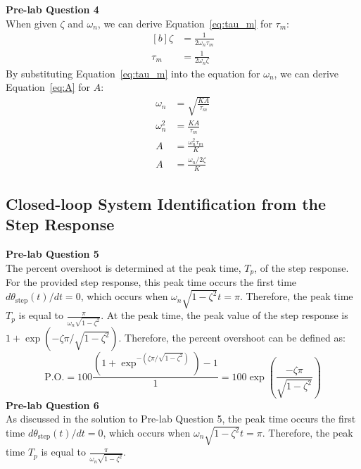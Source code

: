 \documentclass[12pt]{article}
\begin{document}
\textbf{Pre-lab Question 4} \\
When given $\zeta$ and $\omega_n$, we can derive Equation~\ref{eq:tau_m} for $\tau_m$:
\begin{equation} \label{eq:tau_m}
\begin{aligned}[b]
    \zeta &= \frac{1}{2\omega_n\tau_m} \\
    \tau_m &= \frac{1}{2\omega_n\zeta}
\end{aligned}
\end{equation}
By substituting Equation~\ref{eq:tau_m} into the equation for $\omega_n$, we can derive Equation~\ref{eq:A} for $A$:
\begin{equation} \label{eq:A}
\begin{aligned}
    \omega_n &= \sqrt{\frac{KA}{\tau_m}} \\
    \omega_n^2 &= \frac{KA}{\tau_m} \\
    A &= \frac{\omega_n^2\tau_m}{K} \\
    A &= \frac{\omega_n / 2\zeta}{K}
\end{aligned}    
\end{equation}


\subsection{Closed-loop System Identification from the Step Response}
\textbf{Pre-lab Question 5} \\
The percent overshoot is determined at the peak time, $T_p$, of the step response. For the provided step response, this peak time occurs the first time $d\theta_{\text{step}}(t)/dt = 0$, which occurs when $\omega_n\sqrt{1-\zeta^2}t = \pi$. Therefore, the peak time $T_p$ is equal to $\frac{\pi}{\omega_n\sqrt{1-\zeta^2}}$. At the peak time, the peak value of the step response is $1 + \exp\left( -\zeta\pi / \sqrt{1-\zeta^2} \right)$. Therefore, the percent overshoot can be defined as: 
\begin{equation}
    \text{P.O.} = 100\frac{(1 + \exp^{-(\zeta\pi / \sqrt{1-\zeta^2})})-1}{1} = 100\exp\left(\frac{-\zeta\pi}{\sqrt{1-\zeta^2}}\right)
\end{equation}
\textbf{Pre-lab Question 6} \\
As discussed in the solution to Pre-lab Question 5, the peak time occurs the first time $d\theta_{\text{step}}(t)/dt = 0$, which occurs when $\omega_n\sqrt{1-\zeta^2}t = \pi$. Therefore, the peak time $T_p$ is equal to $\frac{\pi}{\omega_n\sqrt{1-\zeta^2}}$.
\end{document}
